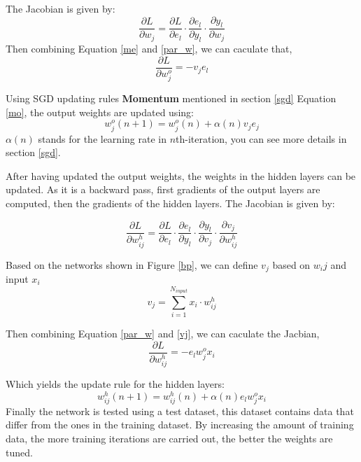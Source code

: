     The Jacobian is given by:
    \begin{equation}
        \frac{\partial L}{\partial w_{j}} = \frac{\partial L}{\partial e_l} \cdot \frac{\partial e_l}{\partial y_l} \cdot \frac{\partial y_l}{\partial w_{j}}
        \label{par_w}
    \end{equation}
    Then combining Equation \ref{me} and \ref{par_w}, we can caculate that,
    \begin{equation}
        \frac{\partial L}{\partial w^{o}_{j}} = -v_j e_l
    \end{equation}

    Using SGD updating rules \textbf{Momentum} mentioned in section \ref{sgd} Equation \ref{mo}, the output weights are updated using:
    \begin{equation}
        w^{o}_{j}(n+1) = w^{o}_{j}(n) + \alpha(n)v_j e_j
    \end{equation}
    $\alpha(n)$ stands for the learning rate in $n$th-iteration, you can see more details in section \ref{sgd}.

    After having updated the output weights, the weights in the hidden layers can be updated. As it is a backward pass, first gradients of the output layers are computed, then the gradients of the hidden layers. The Jacobian is given by:

    \begin{equation}
        \frac{\partial L}{\partial w^{h}_{ij}} = \frac{\partial L}{\partial e_l} \cdot \frac{\partial e_l}{\partial y_l} \cdot \frac{\partial y_l}{\partial v_{j}} \cdot \frac{\partial v_j}{\partial w^{h}_{ij}}
        \label{par_w}
    \end{equation}

    Based on the networks shown in Figure \ref{bp}, we can define $v_j$ based on $w_ij$ and input $x_i$
    \begin{equation}
        v_j = \sum_{i=1}^{N_{input}}x_i\cdot w^{h}_{ij}
        \label{vj}
    \end{equation}


    Then combining Equation \ref{par_w} and \ref{vj}, we can caculate the Jacbian,
    \begin{equation}
        \frac{\partial L}{\partial w_{ij}^{h}} = -e_l w_j^{o} x_i
    \end{equation} 

    Which yields the update rule for the hidden layers:
    \begin{equation}
        w_{ij}^{h}(n+1) = w_{ij}^{h}(n)+ \alpha(n)e_l w_j^{o} x_i
    \end{equation}
    Finally the network is tested using a test dataset, this dataset contains data that differ from the ones in the training dataset. By increasing the amount of training data, the more training iterations are carried out, the better the weights are tuned.
